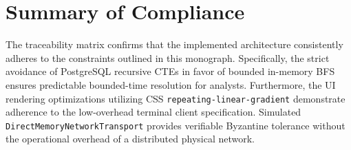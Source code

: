 \section{Summary of Compliance}
The traceability matrix confirms that the implemented architecture consistently adheres to the constraints outlined in this monograph. Specifically, the strict avoidance of PostgreSQL recursive CTEs in favor of bounded in-memory BFS ensures predictable bounded-time resolution for analysts. Furthermore, the UI rendering optimizations utilizing CSS \texttt{repeating-linear-gradient} demonstrate adherence to the low-overhead terminal client specification. Simulated \texttt{DirectMemoryNetworkTransport} provides verifiable Byzantine tolerance without the operational overhead of a distributed physical network.
